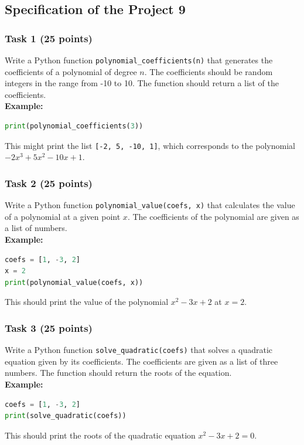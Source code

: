 \documentclass[12pt]{article}
\begin{document}
\subsection{Specification of the Project 9}

\subsubsection{Task 1 (25 points)}
Write a Python function \texttt{polynomial\_coefficients(n)} that generates the coefficients of a polynomial of degree $n$. The coefficients should be random integers in the range from -10 to 10. The function should return a list of the coefficients. \\
\textbf{Example:}
\begin{lstlisting}[language=Python]
print(polynomial_coefficients(3))
\end{lstlisting}
This might print the list \texttt{[-2, 5, -10, 1]}, which corresponds to the polynomial $-2x^3 + 5x^2 - 10x + 1$.

\subsubsection{Task 2 (25 points)}
Write a Python function \texttt{polynomial\_value(coefs, x)} that calculates the value of a polynomial at a given point $x$. The coefficients of the polynomial are given as a list of numbers. \\
\textbf{Example:}
\begin{lstlisting}[language=Python]
coefs = [1, -3, 2]
x = 2
print(polynomial_value(coefs, x))
\end{lstlisting}
This should print the value of the polynomial $x^2 - 3x + 2$ at $x = 2$.

\subsubsection{Task 3 (25 points)}
Write a Python function \texttt{solve\_quadratic(coefs)} that solves a quadratic equation given by its coefficients. The coefficients are given as a list of three numbers. The function should return the roots of the equation. \\
\textbf{Example:}
\begin{lstlisting}[language=Python]
coefs = [1, -3, 2]
print(solve_quadratic(coefs))
\end{lstlisting}
This should print the roots of the quadratic equation $x^2 - 3x + 2 = 0$.
\end{document}
